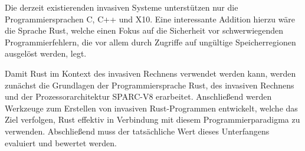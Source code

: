 Die derzeit existierenden invasiven Systeme unterstützen nur die Programmiersprachen C, C++ und X10.
Eine interessante Addition hierzu wäre die Sprache Rust,
welche einen Fokus auf die Sicherheit vor schwerwiegenden Programmierfehlern, die vor 
allem durch Zugriffe auf ungültige Speicherregionen ausgelöst werden, legt.

Damit Rust im Kontext des invasiven Rechnens verwendet werden kann,
werden zunächst die Grundlagen der Programmiersprache Rust,
des invasiven Rechnens und der Prozessorarchitektur SPARC-V8 erarbeitet.
Anschließend werden Werkzeuge zum Erstellen von invasiven
Rust-Programmen entwickelt, welche das Ziel verfolgen,
Rust effektiv in Verbindung mit diesem Programmierparadigma zu verwenden.
Abschließend muss der tatsächliche Wert dieses Unterfangens evaluiert und bewertet werden.
